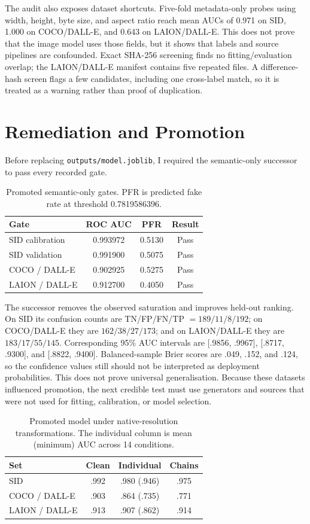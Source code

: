 \documentclass[10pt,twocolumn]{article}
\newcommand{\code}[1]{\texttt{#1}}
\begin{document}
The audit also exposes dataset shortcuts. Five-fold metadata-only probes using width, height, byte
size, and aspect ratio reach mean AUCs of 0.971 on SID, 1.000 on COCO/DALL-E, and 0.643 on
LAION/DALL-E. This does not prove that the image model uses those fields, but it shows that labels and
source pipelines are confounded. Exact SHA-256 screening finds no fitting/evaluation overlap; the
LAION/DALL-E manifest contains five repeated files. A difference-hash screen flags a few candidates,
including one cross-label match, so it is treated as a warning rather than proof of duplication.

\section{Remediation and Promotion}

Before replacing \code{outputs/model.joblib}, I required the semantic-only successor to pass every
recorded gate.

\begin{table}[H]
\centering
\caption{Promoted semantic-only gates. PFR is predicted fake rate at threshold 0.7819586396.}
\label{tab:gates}
\small
\begin{tabularx}{\columnwidth}{@{}Xccc@{}}
\toprule
Gate & ROC AUC & PFR & Result \\
\midrule
SID calibration & 0.993972 & 0.5130 & Pass \\
SID validation & 0.991900 & 0.5075 & Pass \\
COCO / DALL-E & 0.902925 & 0.5275 & Pass \\
LAION / DALL-E & 0.912700 & 0.4050 & Pass \\
\bottomrule
\end{tabularx}
\end{table}

The successor removes the observed saturation and improves held-out ranking. On SID its confusion
counts are TN/FP/FN/TP $=189/11/8/192$; on COCO/DALL-E they are $162/38/27/173$; and on
LAION/DALL-E they are $183/17/55/145$. Corresponding 95\% AUC intervals are [.9856, .9967],
[.8717, .9300], and [.8822, .9400]. Balanced-sample Brier scores are .049, .152, and .124, so the
confidence values still should not be interpreted as deployment probabilities. This does not prove
universal generalisation. Because these datasets influenced promotion, the next credible test must use
generators and sources that were not used for fitting, calibration, or model selection.

\begin{table}[t]
\centering
\caption{Promoted model under native-resolution transformations. The individual column is mean
(minimum) AUC across 14 conditions.}
\label{tab:native-stress}
\small
\begin{tabular}{@{}lccc@{}}
\toprule
Set & Clean & Individual & Chains \\
\midrule
SID & .992 & .980 (.946) & .975 \\
COCO / DALL-E & .903 & .864 (.735) & .771 \\
LAION / DALL-E & .913 & .907 (.862) & .914 \\
\bottomrule
\end{tabular}
\end{table}
\end{document}
